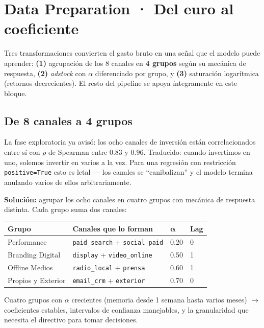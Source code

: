 \section{Data Preparation · Del euro al coeficiente}

\begin{takeaway}
Tres transformaciones convierten el gasto bruto en una señal que el modelo puede aprender: \textbf{(1)} agrupación de los 8 canales en \textbf{4 grupos} según su mecánica de respuesta, \textbf{(2)} \textit{adstock} con $\alpha$ diferenciado por grupo, y \textbf{(3)} saturación logarítmica (retornos decrecientes). El resto del pipeline se apoya íntegramente en este bloque.
\end{takeaway}

\subsection{De 8 canales a 4 grupos}

La fase exploratoria ya avisó: los ocho canales de inversión están correlacionados entre sí con $\rho$ de Spearman entre 0.83 y 0.96. Traducido: cuando invertimos en uno, solemos invertir en varios a la vez. Para una regresión con restricción \texttt{positive=True} esto es letal — los canales se ``canibalizan'' y el modelo termina anulando varios de ellos arbitrariamente.

\begin{decisionbox}
\textbf{Solución:} agrupar los ocho canales en cuatro grupos con mecánica de respuesta distinta. Cada grupo suma dos canales:

\begin{center}
\begin{tabular}{@{}p{3.3cm} p{6.2cm} p{1.4cm} p{1.4cm}@{}}
\toprule
\textbf{Grupo} & \textbf{Canales que lo forman} & $\boldsymbol{\alpha}$ & \textbf{Lag} \\
\midrule
\textcolor{kmgolddark}{Performance}           & \texttt{paid\_search} + \texttt{social\_paid}  & 0.20 & 0 \\
\textcolor{kmgolddark}{Branding Digital}      & \texttt{display} + \texttt{video\_online}     & 0.50 & 1 \\
\textcolor{kmgolddark}{Offline Medios}        & \texttt{radio\_local} + \texttt{prensa}       & 0.60 & 1 \\
\textcolor{kmgolddark}{Propios y Exterior}    & \texttt{email\_crm} + \texttt{exterior}       & 0.70 & 0 \\
\bottomrule
\end{tabular}
\end{center}

Cuatro grupos con $\alpha$ crecientes (memoria desde 1 semana hasta varios meses) $\rightarrow$ coeficientes estables, intervalos de confianza manejables, y la granularidad que necesita el directivo para tomar decisiones.
\end{decisionbox}

